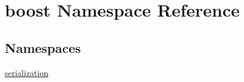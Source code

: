 \hypertarget{namespaceboost}{}\section{boost Namespace Reference}
\label{namespaceboost}
\subsection*{Namespaces}
\begin{DoxyCompactItemize}
\item 
 \hyperlink{namespaceboost_1_1serialization}{serialization}
\end{DoxyCompactItemize}
